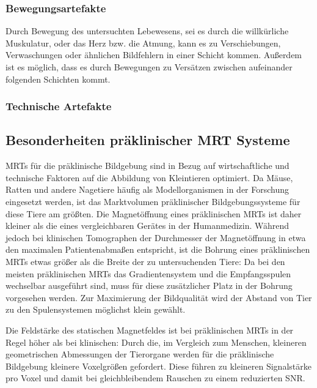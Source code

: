 \subsubsection{Bewegungsartefakte}
Durch Bewegung des untersuchten Lebewesens, sei es durch die willkürliche Muskulatur, oder das Herz bzw. die Atmung, kann es zu Verschiebungen, Verwaschungen oder ähnlichen Bildfehlern in einer Schicht kommen. Außerdem ist es möglich, dass es durch Bewegungen zu Versätzen zwischen aufeinander folgenden Schichten kommt.                       

\subsubsection{Technische Artefakte}

\subsection{Besonderheiten präklinischer MRT Systeme}
MRTs für die präklinische Bildgebung sind in Bezug auf wirtschaftliche und technische Faktoren auf die Abbildung von Kleintieren optimiert. Da Mäuse, Ratten und andere Nagetiere häufig als Modellorganismen in der Forschung eingesetzt werden, ist das Marktvolumen präklinischer Bildgebungssysteme für diese Tiere am größten. \cite{GBanimalStat} Die Magnetöffnung eines präklinischen MRTs ist daher kleiner als die eines vergleichbaren Gerätes in der Humanmedizin. Während jedoch bei klinischen Tomographen der Durchmesser der Magnetöffnung in etwa den maximalen Patientenabmaßen entspricht, ist die Bohrung eines präklinischen MRTs etwas größer als die Breite der zu untersuchenden Tiere: Da bei den meisten präklinischen MRTs das Gradientensystem und die Empfangsspulen wechselbar ausgeführt sind, muss für diese zusätzlicher Platz in der Bohrung vorgesehen werden. Zur Maximierung der Bildqualität wird der Abstand von Tier zu den Spulensystemen möglichst klein gewählt.

Die Feldstärke des statischen Magnetfeldes ist bei präklinischen MRTs in der Regel höher als bei klinischen: Durch die, im Vergleich zum Menschen, kleineren geometrischen Abmessungen der Tierorgane werden für die präklinische Bildgebung kleinere Voxelgrößen gefordert. Diese führen zu kleineren Signalstärke pro Voxel und damit bei gleichbleibendem Rauschen zu einem reduzierten SNR.

